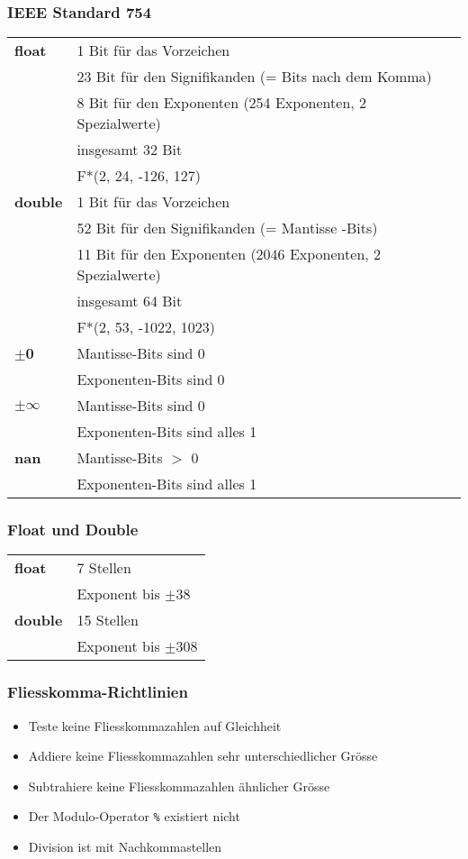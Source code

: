 \documentclass[a3paper, 10pt, landscape]{scrartcl}
\newcommand{\code}[1]{\texttt{#1}}
\begin{document}
\begin{multicols*}{3}
		\subsubsection{IEEE Standard 754}
		\begin{tabular}{l l}
			\textbf{float} & 1 Bit für das Vorzeichen \\
			& 23 Bit für den Signifikanden (= Bits nach dem Komma) \\
			& 8 Bit für den Exponenten (254 Exponenten, 2 Spezialwerte) \\
			\hline
			& insgesamt 32 Bit \\
			& F*(2, 24, -126, 127) \\
			\hline
			\textbf{double} & 1 Bit für das Vorzeichen \\
			& 52 Bit für den Signifikanden (= Mantisse -Bits) \\
			& 11 Bit für den Exponenten (2046 Exponenten, 2 Spezialwerte) \\
			\hline
			&insgesamt 64 Bit \\
			& F*(2, 53, -1022, 1023) \\
			
			\hline\hline 
			
			\textbf{$\pm$0} &Mantisse-Bits sind 0 \\
			& Exponenten-Bits sind 0 \\
			\hline
			\textbf{$\pm \infty$} & Mantisse-Bits sind 0 \\
			& Exponenten-Bits sind alles 1 \\
			\hline
			\textbf{nan} & Mantisse-Bits $>$ 0 \\
			& Exponenten-Bits sind alles 1
			
			
		\end{tabular}
		
		
		\subsubsection{Float und Double}
		\begin{tabular}{l l}
			\textbf{float} & 7 Stellen \\
			& Exponent bis $\pm38$ \\
			\textbf{double} & 15 Stellen \\
			& Exponent bis $\pm308$ \\
		\end{tabular}
		
		\subsubsection{Fliesskomma-Richtlinien}
		\begin{itemize}
			\item Teste keine Fliesskommazahlen auf Gleichheit
			\item Addiere keine Fliesskommazahlen sehr unterschiedlicher Grösse
			\item Subtrahiere keine Fliesskommazahlen ähnlicher Grösse
			\item Der Modulo-Operator \code{\%} existiert nicht
			\item Division ist mit Nachkommastellen
		\end{itemize}
		

\end{multicols*}
\end{document}
